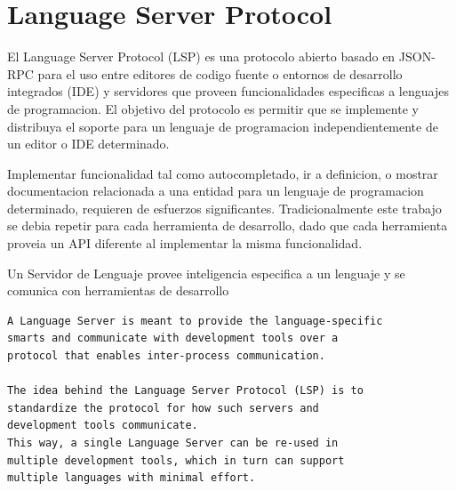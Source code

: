 \section*{Language Server Protocol}

El Language Server Protocol (LSP) es una protocolo abierto basado en JSON-RPC
para el uso entre editores de codigo fuente o entornos de desarrollo integrados
(IDE) y servidores que proveen funcionalidades especificas a lenguajes de
programacion. El objetivo del protocolo es permitir que se implemente y
distribuya el soporte para un lenguaje de programacion independientemente de un
editor o IDE determinado.
\cite{language_server_protocol}

Implementar funcionalidad tal como autocompletado, ir a definicion, o mostrar
documentacion relacionada a una entidad para un lenguaje de programacion
determinado, requieren de esfuerzos significantes. Tradicionalmente este trabajo
se debia repetir para cada herramienta de desarrollo, dado que cada herramienta
proveia un API diferente al implementar la misma funcionalidad.
\cite{language_server_protocol}

Un Servidor de Lenguaje provee inteligencia especifica a un lenguaje y se
comunica con herramientas de desarrollo
\cite{language_server_protocol}

\begin{verbatim}
A Language Server is meant to provide the language-specific
smarts and communicate with development tools over a
protocol that enables inter-process communication.

The idea behind the Language Server Protocol (LSP) is to
standardize the protocol for how such servers and
development tools communicate.
This way, a single Language Server can be re-used in
multiple development tools, which in turn can support
multiple languages with minimal effort.
\end{verbatim}
\cite{language_server_protocol}


